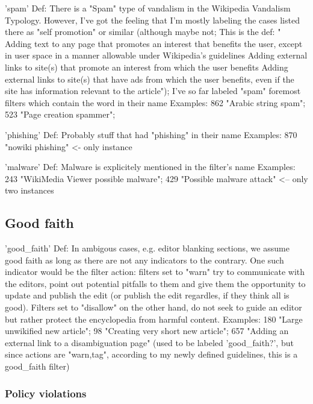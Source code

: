 'spam'
  Def: There is a "Spam" type of vandalism in the Wikipedia Vandalism Typology. However, I've got the feeling that I'm mostly labeling the cases listed there as "self promotion" or similar (although maybe not; This is the def: "    Adding text to any page that promotes an interest that benefits the user, except in user space in a manner allowable under Wikipedia's guidelines
    Adding external links to site(s) that promote an interest from which the user benefits
    Adding external links to site(s) that have ads from which the user benefits, even if the site has information relevant to the article");
  I've so far labeled "spam" foremost filters which contain the word in their name
  Examples: 862 "Arabic string spam";  523 "Page creation spammer";

'phishing'
  Def: Probably stuff that had "phishing" in their name
  Examples: 870 "nowiki phishing" <- only instance

'malware'
  Def: Malware is explicitely mentioned in the filter's name %
  Examples: 243 "WikiMedia Viewer possible malware"; 429 "Possible malware attack" <-- only two instances

\subsection{Good faith}

'good\_faith'
  Def: In ambigous cases, e.g. editor blanking sections, we assume good faith as long as there are not any indicators to the contrary. One such indicator would be the filter action: filters set to "warn" try to communicate with the editors, point out potential pitfalls to them and give them the opportunity to update and publish the edit (or publish the edit regardles, if they think all is good). Filters set to "disallow" on the other hand, do not seek to guide an editor but rather protect the encyclopedia from harmful content.
  Examples: 180	"Large unwikified new article"; 98 "Creating very short new article"; 657 "Adding an external link to a disambiguation page" (used to be labeled 'good\_faith?', but since actions are "warn,tag", according to my newly defined guidelines, this is a good\_faith filter)

\subsubsection{Policy violations}

